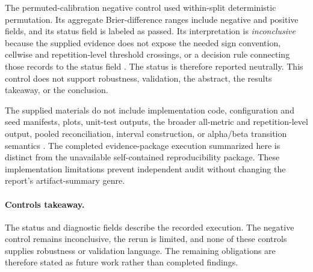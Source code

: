 \documentclass{article}
\begin{document}
The permuted-calibration negative control used within-split deterministic permutation. Its aggregate Brier-difference ranges include negative and positive fields, and its status field is labeled as passed. Its interpretation is \emph{inconclusive} because the supplied evidence does not expose the needed sign convention, cellwise and repetition-level threshold crossings, or a decision rule connecting those records to the status field \cite{exec}. The status is therefore reported neutrally. This control does not support robustness, validation, the abstract, the results takeaway, or the conclusion.

The supplied materials do not include implementation code, configuration and seed manifests, plots, unit-test outputs, the broader all-metric and repetition-level output, pooled reconciliation, interval construction, or alpha/beta transition semantics \cite{exec}. The completed evidence-package execution summarized here is distinct from the unavailable self-contained reproducibility package. These implementation limitations prevent independent audit without changing the report's artifact-summary genre.

\paragraph{Controls takeaway.} The status and diagnostic fields describe the recorded execution. The negative control remains inconclusive, the rerun is limited, and none of these controls supplies robustness or validation language. The remaining obligations are therefore stated as future work rather than completed findings.
\end{document}
